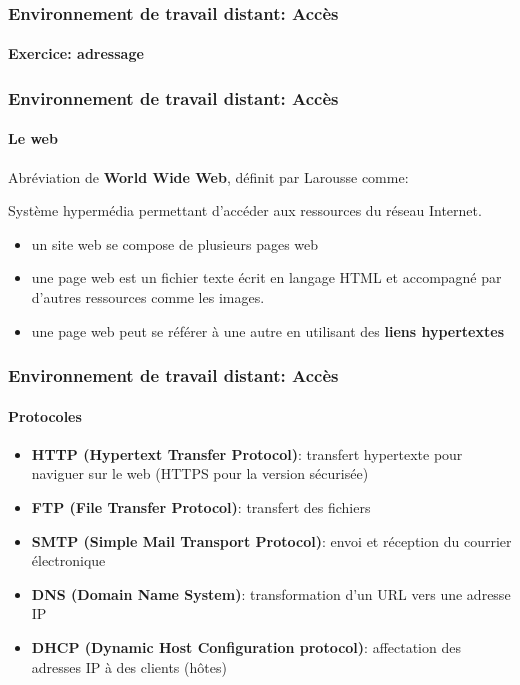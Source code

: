 \documentclass{beamer}
\begin{document}
\begin{frame}
\frametitle{Environnement de travail distant: Accès}
\framesubtitle{Exercice: adressage}




\end{frame}


\begin{frame}
\frametitle{Environnement de travail distant: Accès}
\framesubtitle{Le web}

Abréviation de \textbf{World Wide Web}, définit par Larousse comme:
\begin{definition}
	Système hypermédia permettant d'accéder aux ressources du réseau Internet.
\end{definition}

\begin{itemize}
	\item un site web se compose de plusieurs pages web
	\item une page web est un fichier texte écrit en langage HTML et accompagné par d'autres ressources comme les images. 
	\item une page web peut se référer à une autre en utilisant des \textbf{liens hypertextes} 
\end{itemize}

\end{frame}


\begin{frame}
\frametitle{Environnement de travail distant: Accès}
\framesubtitle{Protocoles}

\begin{itemize}
	\item \textbf{HTTP (Hypertext Transfer Protocol)}: transfert hypertexte pour naviguer sur le web  (HTTPS pour la
	version sécurisée)
	\item \textbf{FTP (File Transfer Protocol)}: transfert des fichiers
	\item \textbf{SMTP (Simple Mail Transport Protocol)}: envoi et réception du courrier électronique
	\item \textbf{DNS (Domain Name System)}: transformation d'un URL vers une adresse IP
	\item \textbf{DHCP (Dynamic Host Configuration protocol)}: affectation des adresses IP à des clients (hôtes)
\end{itemize}

\end{frame}
\end{document}
